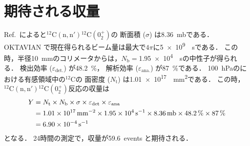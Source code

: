 \documentclass[../master]{subfiles}
\begin{document}
\section{期待される収量}
Ref.~\cite{takahashietal,kondoetal}によると${}^{12}\mathrm{C}(\mathrm{n},\mathrm{n}'){}^{12}\mathrm{C}(0_{2}^{+})$の
断面積 ($\sigma$) は\SI{8.36}{\milli\barn}である．
OKTAVIAN で現在得られるビーム量は最大で$4\pi$に\SI{5e9}{\per\second}である．
この時，半径\SI{10}{\milli\metre}のコリメータからは，$N_{\text{b}}=$\SI{1.95e4}{\per\second}の中性子が得られる．
検出効率 ($\varepsilon_{\text{det.}}$) が\SI{48.2}{\percent}，
解析効率 ($\varepsilon_{\text{ana.}}$) が\SI{87}{\percent}である．
\SI{100}{\hecto\pascal}の\isoButaneHydro における有感領域中の${}^{12}\mathrm{C}$の
面密度 ($N_{\text{t}}$) は\SI{1.01e17}{\per\square\milli\metre}である．
この時，${}^{12}\mathrm{C}(\mathrm{n},\mathrm{n}'){}^{12}\mathrm{C}(0_{2}^{+})$反応の収量は
\begin{align}
  Y &= N_{\text{t}}\times N_{\text{b}}\times \sigma \times\varepsilon_{\text{det}}\times\varepsilon_{\text{ana}} \notag\\
  &= \SI{1.01e17}{\per\square\milli\metre}\times\SI{1.95e4}{\per\second}\times\SI{8.36}{\milli\barn}
  \times\SI{48.2}{\percent}\times\SI{87}{\percent} \notag\\
  &= \SI{6.90e-4}{\per\second}
\end{align}
となる．
24時間の測定で，収量が59.6~events と期待される．
\end{document}
